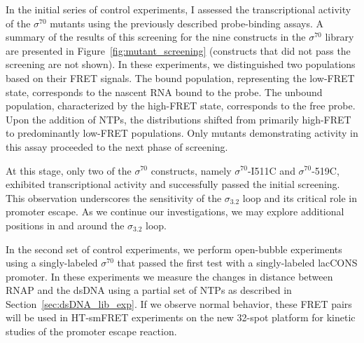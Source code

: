 In the initial series of control experiments, I assessed the transcriptional activity of the $\sigma^{70}$ mutants using the previously described probe-binding assays. 
A summary of the results of this screening for the nine constructs in the $\sigma^{70}$ library are presented in Figure~\ref{fig:mutant_screening} (constructs that did not pass the screening are not shown).
In these experiments, we distinguished two populations based on their FRET signals. 
The bound population, representing the low-FRET state, corresponds to the nascent RNA bound to the probe. 
The unbound population, characterized by the high-FRET state, corresponds to the free probe. 
Upon the addition of \ac{NTP}s, the distributions shifted from primarily high-FRET to predominantly low-FRET populations. 
Only mutants demonstrating activity in this assay proceeded to the next phase of screening.

At this stage, only two of the $\sigma^{70}$ constructs, namely $\sigma^{70}$-I511C and $\sigma^{70}$-519C, exhibited transcriptional activity and successfully passed the initial screening. 
This observation underscores the sensitivity of the $\sigma_{3.2}$ loop and its critical role in promoter escape. 
As we continue our investigations, we may explore additional positions in and around the $\sigma_{3.2}$ loop.

In the second set of control experiments, we perform open-bubble experiments using a singly-labeled $\sigma^{70}$ that passed the first test with a singly-labeled \ac{lacCONS} promoter. 
In these experiments we measure the changes in distance between \ac{RNAP} and the \ac{dsDNA} using a partial set of \ac{NTP}s as described in Section~\ref{sec:dsDNA_lib_exp}.
If we observe normal behavior, these FRET pairs will be used in \ac{HT-smFRET} experiments on the new 32-spot platform for kinetic studies of the promoter escape reaction. 

